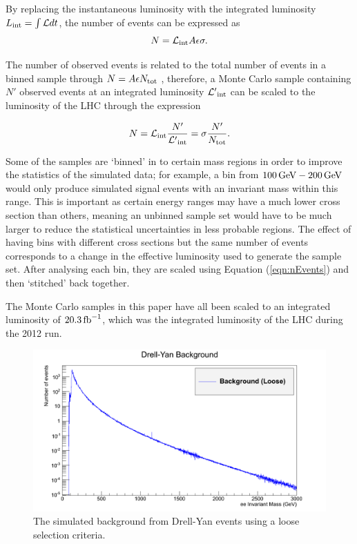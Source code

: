 \documentclass{article}
\begin{document}
By replacing the instantaneous luminosity with the integrated luminosity ${L}_{\rm{int}} = \int \mathcal{L}dt$, the number of events can be expressed as
\begin{equation}
N= \mathcal{L}_{\rm{int}}A\epsilon\sigma.
\end{equation}

The number of observed events is related to the total number of events in a binned sample through $N = A\epsilon N_{\rm{tot}}$ , therefore, a Monte Carlo sample containing $N'$ observed events at an integrated luminosity $\mathcal{L'}_{\rm{int}}$ can be scaled to the luminosity of the LHC through the expression

\begin{equation}
N = \mathcal{L}_{\rm{int}}\frac{N'}{\mathcal{L'}_{\rm{int}}} = \sigma\frac{N'}{N_{\rm{tot}}}.
\label{eqn:nEvents}
\end{equation}

Some of the samples are `binned' in to certain mass regions in order to improve the statistics of the simulated data; for example, a bin from $100\,\rm{GeV}-200\,\rm{GeV}$ would only produce simulated signal events with an invariant mass within this range. This is important as certain energy ranges may have a much lower cross section than others, meaning an unbinned sample set would have to be much larger to reduce the statistical uncertainties in less probable regions. The effect of having bins with different cross sections but the same number of events corresponds to a change in the effective luminosity used to generate the sample set. After analysing each bin, they are scaled using Equation (\ref{eqn:nEvents}) and then `stitched' back together.

The Monte Carlo samples in this paper have all been scaled to an integrated luminosity of $20.3\,\rm{fb}^{-1}$, which was the integrated luminosity of the LHC during the 2012 run.

\begin{figure}[h]
    \centering
    \includegraphics[scale=0.25]{images/DYBackground.png}
    \caption{The simulated background from Drell-Yan events using a loose selection criteria. \label{fig:DYBackground}}
\end{figure}
\end{document}
